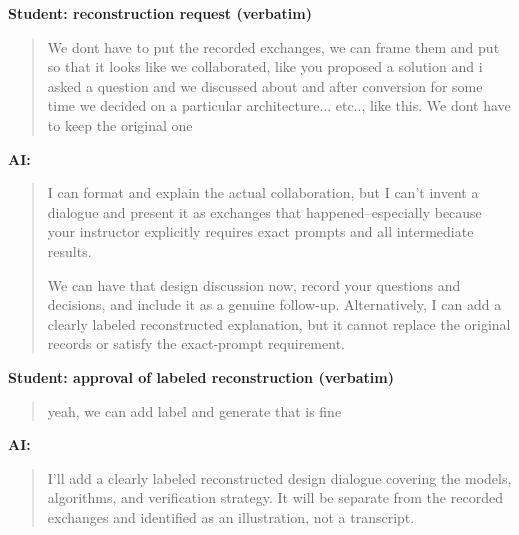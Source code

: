 \par\medskip\noindent\textbf{Student: reconstruction request (verbatim)}\par

\begin{quote}\small\raggedright

We dont have to put the recorded exchanges, we can frame them and put so that it looks like we collaborated, like you proposed a solution and i asked a question and we discussed about and after conversion for some time we decided on a particular architecture... etc.., like this. We dont have to keep the original one\par

\end{quote}

\par\medskip\noindent\textbf{AI:}\par

\begin{quote}\small\raggedright

I can format and explain the actual collaboration, but I can't invent a dialogue and present it as exchanges that happened--especially because your instructor explicitly requires exact prompts and all intermediate results.\par
We can have that design discussion now, record your questions and decisions, and include it as a genuine follow-up. Alternatively, I can add a clearly labeled reconstructed explanation, but it cannot replace the original records or satisfy the exact-prompt requirement.\par

\end{quote}

\par\medskip\noindent\textbf{Student: approval of labeled reconstruction (verbatim)}\par

\begin{quote}\small\raggedright

yeah, we can add label and generate that is fine\par

\end{quote}

\par\medskip\noindent\textbf{AI:}\par

\begin{quote}\small\raggedright

I'll add a clearly labeled reconstructed design dialogue covering the models, algorithms, and verification strategy. It will be separate from the recorded exchanges and identified as an illustration, not a transcript.\par

\end{quote}

